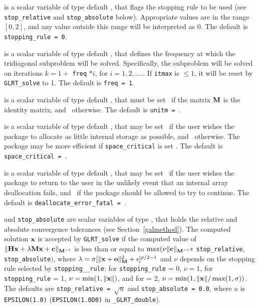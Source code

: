 \documentclass{galahad}
\newcommand{\packagename}{GL\-RT}
\newcommand{\fullpackagename}{\libraryname\_\packagename}
\begin{document}
\begin{description}
 is a scalar variable of type default \integer, that
flags the stopping rule to be used (see {\tt stop\_relative} and
{\tt stop\_absolute} below).
Appropriate values are in the range $[0,2]$, and any value outside this range
will be interpreted as 0.
The default is {\tt stopping\_rule = 0}.

 is a scalar variable of type default \integer, that
defines the frequency at which the tridiagonal subproblem will
be solved. Specifically, the subproblem will be solved on iterations
$k=1+$ {\tt freq} $\ast i$, for $i = 1, 2, \ldots.$.
If {\tt itmax} is $\leq 1$, it will be reset by
{\tt \packagename\_solve} to 1.
The default is {\tt freq = 1}.

 is a scalar variable of type default \logical, that
must be set \true\ if the matrix ${\mathbf{M}}$ is the identity matrix, and
\false\ otherwise.
The default is {\tt unitm = \true}.

 is a scalar variable of type default \logical, that
may be set \true\ if the user wishes the package to allocate as little
internal storage as possible, and \false\ otherwise. The package may
be more efficient if {\tt space\_critical} is set \false.
The default is {\tt space\_critical = \false}.

 is a scalar variable of type default \logical,
that may be set \true\ if the user wishes the package to return to the user
in the unlikely event that an internal array deallocation fails,
and \false\ if the package should be allowed to try to continue.
The default is {\tt deallocate\_error\_fatal = \false}.

 and {\tt stop\_absolute} are scalar variables of type
\realdp, that holds the
relative and absolute convergence tolerances (see Section~\ref{galmethod}).
The computed solution ${\mathbf{x}}$ is accepted by {\tt \packagename\_solve}
if the computed value of
$\|{\mathbf{H}} {\mathbf{x}} + \lambda {\mathbf{M}} {\mathbf{x}} + {\mathbf{c}}\|_{{{\mathbf{M}}^{-1}}} $ is less than or equal
to $\max (\nu \| {\mathbf{c}}\|_{{\mathbf{M}}^{-1}} \ast$ {\tt stop\_relative},
{\tt stop\_absolute}$)$, where $\lambda =
\sigma [ \|{\mathbf{x}}+{\mathbf{o}}\|_{{\mathbf{M}}}^2 + \epsilon]^{p/2-1}$ and $\nu$
depends on the stopping rule selected by %
{\tt stopping\_\_rule}:
for  {\tt stopping\_rule} = 0, $\nu = 1$,
for  {\tt stopping\_rule} = 1, $\nu = \min( 1, \|{\mathbf{x}}\|)$, and
for   = 2,
$\nu = \min( 1, \|{\mathbf{x}}\|/ \max(1,\sigma))$.
The defaults are {\tt stop\_relative = $\sqrt{u}$} and
{\tt stop\_absolute = 0.0},
where $u$ is {\tt EPSILON(1.0)} ({\tt EPSILON(1.0D0)} in
{\tt \fullpackagename\_double}).


\end{description}
\end{document}
